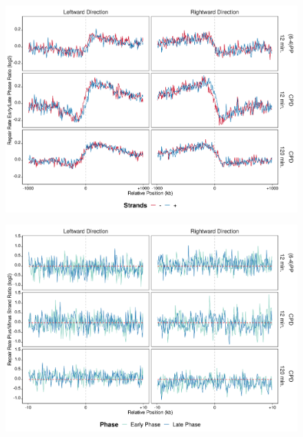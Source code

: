 \begin{figure}[H]
\begin{center}
\includegraphics[width=\textwidth]{Chapters/7_appendix/figures/supfig73}
\caption[]{}
\label{supfig:}
\end{center}
\end{figure}

\begin{figure}[H]
\begin{center}
\includegraphics[width=\textwidth]{Chapters/7_appendix/figures/supfig74}
\caption[]{}
\label{supfig:}
\end{center}
\end{figure}

